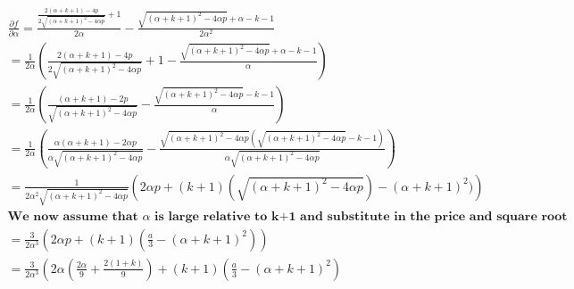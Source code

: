 \documentclass[12pt]{report}
\numberwithin{equation}{section}
\begin{document}
\begin{align*}
\frac{\partial f}{\partial \alpha} = \frac{\frac{2 (\alpha+k+1)-4 p}{2 \sqrt{(\alpha+k+1)^2-4 \alpha p}}+1}{2
   \alpha}-\frac{\sqrt{(\alpha+k+1)^2-4 \alpha p}+\alpha-k-1}{2 \alpha^2} \\
=\frac{1}{2 \alpha}
\left( 
\frac{2 (\alpha+k+1)-4 p}{2 \sqrt{(\alpha+k+1)^2-4 \alpha p}}+1-\frac{\sqrt{(\alpha+k+1)^2-4 \alpha p}+\alpha-k-1}{ \alpha}
\right) \\
=\frac{1}{2 \alpha}
\left( 
\frac{ (\alpha+k+1)-2 p}{ \sqrt{(\alpha+k+1)^2-4 \alpha p}}-\frac{\sqrt{(\alpha+k+1)^2-4 \alpha p}-k-1}{ \alpha}
\right) \\
=\frac{1}{2 \alpha}
\left( 
\frac{ \alpha (\alpha+k+1)-2 \alpha p}{ \alpha\sqrt{(\alpha+k+1)^2-4 \alpha p}}-\frac{\sqrt{(\alpha+k+1)^2-4 \alpha p}(\sqrt{(\alpha+k+1)^2-4 \alpha p}-k-1)}{ \alpha\sqrt{(\alpha+k+1)^2-4 \alpha p}}
\right) \\
=\frac{1}{2 \alpha^2 \sqrt{(\alpha+k+1)^2-4 \alpha p}}
\left( 
2 \alpha p+(k+1)(\sqrt{(\alpha+k+1)^2-4 \alpha p})-(\alpha+k+1)^2)
\right) \\
\textbf{We now assume that $\alpha$ is large relative to k+1 and substitute in the price and square root}
\\
=\frac{3}{2 \alpha^3 }
\left( 
2 \alpha p+(k+1)(\frac{a}{3}-(\alpha+k+1)^2)
\right) \\
=\frac{3}{2 \alpha^3 }
\left( 
2 \alpha (\frac{2\alpha}{9}+\frac{2(1+k)}{9})+(k+1)(\frac{a}{3}-(\alpha+k+1)^2)

\end{align*}
\end{document}
